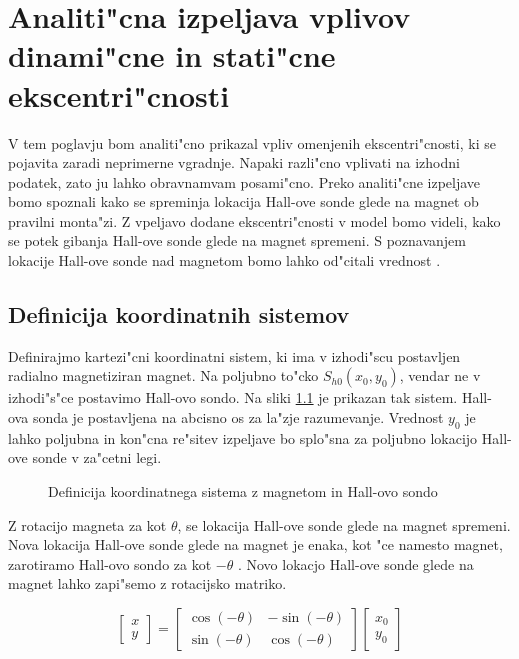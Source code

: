 \chapter{Analiti"cna izpeljava vplivov dinami"cne in stati"cne ekscentri"cnosti}

V tem poglavju bom analiti"cno prikazal vpliv omenjenih ekscentri"cnosti, ki se pojavita zaradi neprimerne vgradnje. Napaki razli"cno vplivati na izhodni podatek, zato ju lahko obravnamvam posami"cno. Preko analiti"cne izpeljave bomo spoznali kako se spreminja lokacija Hall-ove sonde glede na magnet ob pravilni monta"zi. Z vpeljavo dodane ekscentri"cnosti v model bomo videli, kako se potek gibanja Hall-ove sonde glede na magnet spremeni. S poznavanjem lokacije Hall-ove sonde nad magnetom bomo lahko od"citali vrednost \Bz.


\section{Definicija koordinatnih sistemov}

Definirajmo kartezi"cni koordinatni sistem, ki ima v izhodi"scu postavljen radialno magnetiziran magnet. Na poljubno to"cko $S_{h0}(x_0,y_0)$, vendar ne v izhodi"s"ce postavimo Hall-ovo sondo. Na sliki \ref{fig:def_kks} je prikazan tak sistem. Hall-ova sonda je postavljena na abcisno os za la"zje razumevanje. Vrednost $y_0$ je lahko poljubna in kon"cna re"sitev izpeljave bo splo"sna za poljubno lokacijo Hall-ove sonde v za"cetni legi.

\begin{figure}[h!]
	\centering
	\caption{Definicija koordinatnega sistema z magnetom in Hall-ovo sondo}
	\label{fig:def_kks}
\end{figure}

Z rotacijo magneta za kot $\theta$, se lokacija Hall-ove sonde glede na magnet spremeni. Nova lokacija Hall-ove sonde glede na magnet je enaka, kot "ce namesto magnet, zarotiramo Hall-ovo sondo za kot $-\theta$ . Novo lokacjo Hall-ove sonde glede na magnet lahko zapi"semo z rotacijsko matriko.

\begin{equation}
\label{equ:rotacija_hall}
\begin{bmatrix} x\\y \end{bmatrix}=
\begin{bmatrix} \cos(-\theta)&-\sin(-\theta)\\\sin(-\theta)&\cos(-\theta) \end{bmatrix}
\begin{bmatrix} x_0\\y_0 \end{bmatrix}
\end{equation}

